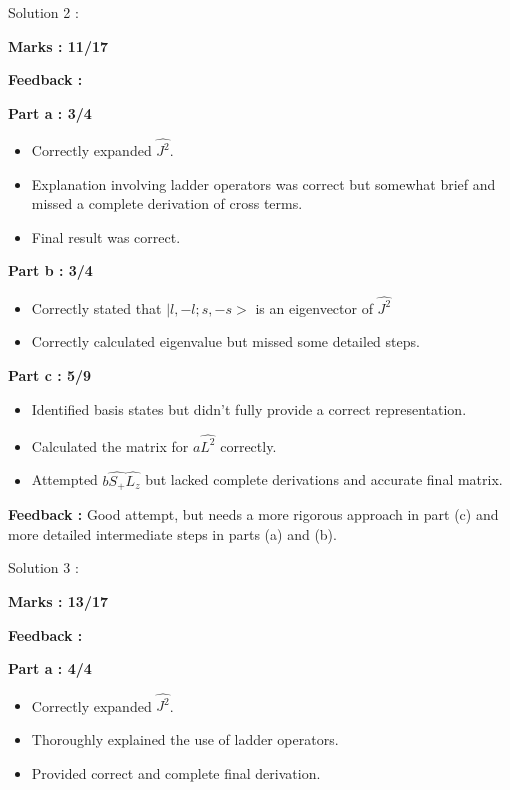 \documentclass[a4paper,11pt]{article}
\begin{document}
Solution 2 :

\textbf{Marks : 11/17}

\textbf{Feedback : }

\textbf{Part a : 3/4}

\begin{itemize}
    \item Correctly expanded $\hat{J^2}$.
    \item Explanation involving ladder operators was correct but somewhat brief and missed a complete derivation of cross terms.
    \item Final result was correct.
\end{itemize}


\textbf{Part b : 3/4}

\begin{itemize}
    \item Correctly stated that $|l, -l;s, -s>$ is an eigenvector of $\hat{J^2}$
    \item Correctly calculated eigenvalue but missed some detailed steps.
\end{itemize}


\textbf{Part c : 5/9}

\begin{itemize}
    \item Identified basis states but didn't fully provide a correct representation.
    \item Calculated the matrix for $a\hat{L^2}$ correctly.
    \item Attempted $b\hat{S_+}\hat{L_z}$ but lacked complete derivations and accurate final matrix.
\end{itemize}

\textbf{Feedback :}
Good attempt, but needs a more rigorous approach in part (c) and more detailed intermediate steps in parts (a) and (b).


Solution 3 :

\textbf{Marks : 13/17}

\textbf{Feedback : }

\textbf{Part a : 4/4}

\begin{itemize}
    \item Correctly expanded $\hat{J^2}$.
    \item Thoroughly explained the use of ladder operators.
    \item Provided correct and complete final derivation.
\end{itemize}
\end{document}
